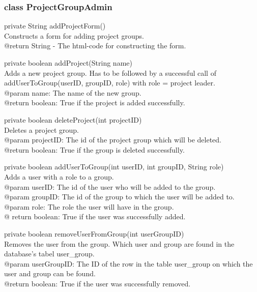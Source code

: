 \documentclass[a4paper]{article}
\begin{document}
\subsubsection{class ProjectGroupAdmin}

\begin{hangparas}{1.5em}{1}
private String addProjectForm()\\
Constructs a form for adding project groups.\\
@return String - The html-code for constructing the form.
\end{hangparas}

\vspace{5mm}
\begin{hangparas}{1.5em}{1}
private boolean addProject(String name)\\
Adds a new project group. Has to be followed by a successful call of addUserToGroup(userID, groupID, role) with role = project leader.\\
@param name: The name of the new group.\\
@return boolean: True if the project is added successfully.
\end{hangparas}

\vspace{5mm}
\begin{hangparas}{1.5em}{1}
private boolean deleteProject(int projectID)\\
Deletes a project group.\\
@param projectID: The id of the project group which will be deleted.\\
@return boolean: True if the group is deleted successfully.
\end{hangparas}

\vspace{5mm}
\begin{hangparas}{1.5em}{1}
private boolean addUserToGroup(int userID, int groupID, String role)\\
Adds a user with a role to a group.\\
@param userID: The id of the user who will be added to the group.\\
@param groupID: The id of the group to which the user will be added to.\\
@param role: The role the user will have in the group.\\
@ return boolean: True if the user was successfully added.
\end{hangparas}

\vspace{5mm}
\begin{hangparas}{1.5em}{1}
private boolean removeUserFromGroup(int userGroupID)\\
Removes the user from the group. Which user and group are found in the database's tabel user\_group.\\
@param userGroupID: The ID of the row in the table user\_group on which the user and group can be found.\\
@return boolean: True if the user was successfully removed.\\
\end{hangparas}
\end{document}
